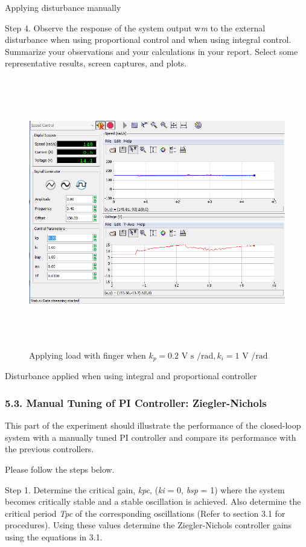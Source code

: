 \documentclass[]{article}
\begin{document}
Applying disturbance manually

Step 4. Observe the response of the system output w\emph{m} to the
external disturbance when using proportional control and when using
integral control. Summarize your observations and your calculations in
your report. Select some representative results, screen captures, and
plots.

\begin{figure}\includegraphics[width=6.50000in,height=4.63889in]{media/image26.png} \caption{Applying load with finger when $k_p = \text{0.2 V s /rad}, k_i = \text{1 V /rad}$} \end{figure}

Disturbance applied when using integral and proportional controller

\subsubsection{5.3. Manual Tuning of PI Controller:
Ziegler-Nichols}\label{manual-tuning-of-pi-controller-ziegler-nichols}

This part of the experiment should illustrate the performance of the
closed-loop system with a manually tuned PI controller and compare its
performance with the previous controllers.

Please follow the steps below.

Step 1. Determine the critical gain, \emph{kpc}, (\emph{ki} = 0,
\emph{bsp} = 1) where the system becomes critically stable and a stable
oscillation is achieved. Also determine the critical period \emph{Tpc}
of the corresponding oscillations (Refer to section 3.1 for procedures).
Using these values determine the Ziegler-Nichols controller gains using
the equations in 3.1.
\end{document}
